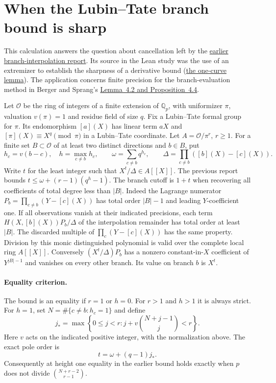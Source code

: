 \section{When the Lubin--Tate branch bound is sharp}
\label{sec:branch-equality}

This calculation answers the question about cancellation left by the
\href{https://github.com/VladimirReshetnikov/ProveIt/blob/5cc267af75a635199ac5d93a7d49cbce521daefc/docs/incoming/grh_transfers_cycle_signings_and_lubin_tate.zip}{earlier branch-interpolation report}.
Its source in the Lean study was the use of an extremizer to establish the
sharpness of a derivative bound
(\href{https://github.com/lsernau/grh-lean/blob/72fead102f663d5c7a407964a13dc0cf9d977207/grh/src/New/Derivatives/Sharpness/OneCurve.lean\#L165-L183}{the one-curve lemma}).
The application concerns finite precision for the branch-evaluation method
in Berger and Sprang's \href{https://arxiv.org/abs/2502.18053}{Lemma~4.2 and Proposition~4.4}.

Let $\mathcal O$ be the ring of integers of a finite extension of
$\mathbb Q_p$, with uniformizer $\pi$, valuation $v(\pi)=1$ and residue
field of size $q$. Fix a Lubin--Tate formal group for $\pi$.
Its endomorphism $[a](X)$ has linear term $aX$ and
$[\pi](X)\equiv X^q\pmod\pi$ in a Lubin--Tate coordinate.
Let $A=\mathcal O/\pi^r$, $r\ge1$.
For a finite set $B\subset\mathcal O$ of at least two distinct directions
and $b\in B$, put
\[
 h_c=v(b-c),\quad h=\max_{c\ne b}h_c,\qquad
 \omega=\sum_{c\ne b}q^{h_c},\qquad
 \Delta=\prod_{c\ne b}([b](X)-[c](X)).
\]
Write $t$ for the least integer such that $X^t/\Delta\in A[[X]]$.
The previous report bounds $t\le\omega+(r-1)(q^h-1)$.
The branch cutoff is $1+t$ when recovering all coefficients of total degree
less than $|B|$. Indeed the Lagrange numerator
$P_b=\prod_{c\ne b}(Y-[c](X))$ has total order $|B|-1$ and leading
$Y$-coefficient one. If all observations vanish at their indicated
precisions, each term $H(X,[b](X))P_b/\Delta$ of the interpolation
remainder has total order at least $|B|$. The discarded multiple of
$\prod_c(Y-[c](X))$ has the same property. Division by this monic
distinguished polynomial is valid over the complete local ring $A[[X]]$.
Conversely $(X^t/\Delta)P_b$ has a nonzero constant-in-$X$ coefficient of $Y^{|B|-1}$
and vanishes on every other branch. Its value on branch $b$ is $X^t$.

\paragraph{Equality criterion.}
The bound is an equality if $r=1$ or $h=0$. For $r>1$ and $h>1$ it is
always strict. For $h=1$, set $N=\#\{c\ne b:h_c=1\}$ and define
\[
 j_* =\max\left\{0\le j<r:
         j+v\!\binom{N+j-1}{j}<r\right\}.
\]
Here $v$ acts on the indicated positive integer, with the normalization
above. The exact pole order is
\[
                    t=\omega+(q-1)j_* .
\]
Consequently at height one equality in the earlier bound holds exactly
when $p$ does not divide $\binom{N+r-2}{r-1}$.

